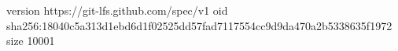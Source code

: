 version https://git-lfs.github.com/spec/v1
oid sha256:18040c5a313d1ebd6d1f02525dd57fad7117554cc9d9da470a2b5338635f1972
size 10001
